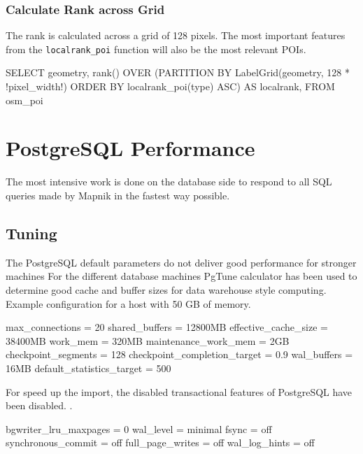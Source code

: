 \subsubsection{Calculate Rank across Grid}

The rank is calculated across a grid of 128 pixels. The most
important features from the \texttt{localrank\_poi} function will
also be the most relevant POIs.

\begin{sqlcode}
SELECT
  geometry,
  rank() OVER (PARTITION BY LabelGrid(geometry, 128 * !pixel_width!)
               ORDER BY localrank_poi(type) ASC) AS localrank,
FROM osm_poi
\end{sqlcode}

\section{PostgreSQL Performance}
\label{postgres-performance}

The most intensive work is done on the database side to respond to all SQL queries made by Mapnik in the fastest way possible.

\subsection{Tuning}

The PostgreSQL default parameters do not deliver good performance for stronger machines\cite{84_wiki.postgresql.org_2015}
For the different database machines PgTune\cite{85_pgtune.leopard.in.ua_2015} calculator has been used to determine good cache and buffer sizes for data warehouse style computing.
\\
Example configuration for a host with 50 GB of memory.

\begin{bashcode}
max_connections = 20
shared_buffers = 12800MB
effective_cache_size = 38400MB
work_mem = 320MB
maintenance_work_mem = 2GB
checkpoint_segments = 128
checkpoint_completion_target = 0.9
wal_buffers = 16MB
default_statistics_target = 500
\end{bashcode}

For speed up the import, the disabled transactional features of PostgreSQL have been disabled. \cite{86_berkus_berkus_profile_2015}.

\begin{bashcode}
bgwriter_lru_maxpages = 0
wal_level = minimal
fsync = off
synchronous_commit = off
full_page_writes = off
wal_log_hints = off
\end{bashcode}

